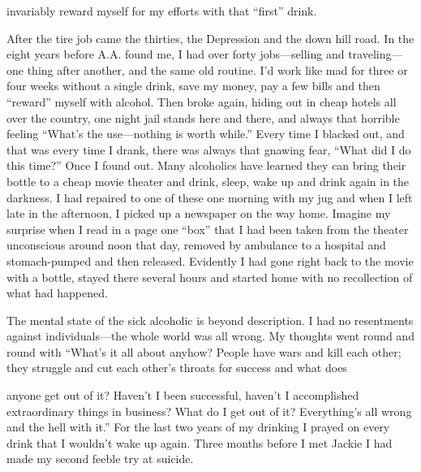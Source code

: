 \begin{biblechapter}
invariably reward myself for my efforts with that “first” drink.

After the tire job came the thirties, the Depression and the down hill road. In the eight years before A.A. found me, I had over forty jobs—selling and traveling—one thing after another, and the same old routine. I’d work like mad for three or four weeks without a single drink, save my money, pay a few bills and then “reward” myself with alcohol. Then broke again, hiding out in cheap hotels all over the country, one night jail stands here and there, and always that horrible feeling “What’s the use—nothing is worth while.” Every time I blacked out, and that was every time I drank, there was always that gnawing fear, “What did I do this time?” Once I found out. Many alcoholics have learned they can bring their bottle to a cheap movie theater and drink, sleep, wake up and drink again in the darkness. I had repaired to one of these one morning with my jug and when I left late in the afternoon, I picked up a newspaper on the way home. Imagine my surprise when I read in a page one “box” that I had been taken from the theater unconscious around noon that day, removed by ambulance to a hospital and stomach-pumped and then released. Evidently I had gone right back to the movie with a bottle, stayed there several hours and started home with no recollection of what had happened.

The mental state of the sick alcoholic is beyond description. I had no resentments against individuals—the whole world was all wrong. My thoughts went round and round with “What’s it all about anyhow? People have wars and kill each other; they struggle and cut each other’s throats for success and what does

anyone get out of it? Haven’t I been successful, haven’t I accomplished extraordinary things in business? What do I get out of it? Everything’s all wrong and the hell with it.” For the last two years of my drinking I prayed on every drink that I wouldn’t wake up again. Three months before I met Jackie I had made my second feeble try at suicide.


\end{biblechapter}
